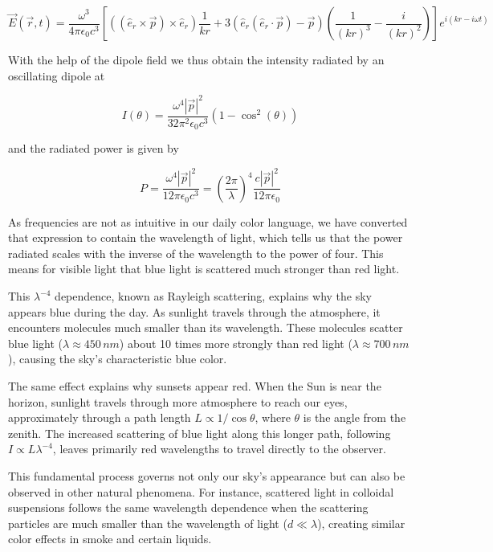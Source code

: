 \documentclass[
  a4paper,
]{book}
\begin{document}
\[
\vec{E}(\vec{r},t)=\frac{\omega^3}{4\pi \epsilon_0 c^3} \left [ ((\hat{e}_r\times \vec{p})\times \hat{e}_r)\frac{1}{k r}+3(\hat{e}_r(\hat{e}_r\cdot \vec{p})-\vec{p})\left(\frac{1}{(k r)^3}-\frac{i}{(kr)^2} \right)\right] e^{i(kr -i \omega t)}
\]

With the help of the dipole field we thus obtain the intensity radiated
by an oscillating dipole at

\[
I(\theta)=\frac{\omega^4|\vec{p}|^2}{32\pi^2 \epsilon_0 c^3}(1-\cos^2(\theta))
\]

and the radiated power is given by

\[
P=\frac{\omega^4 |\vec{p}|^2}{12\pi \epsilon_0 c^3}=\left (\frac{2\pi}{\lambda}\right )^4\frac{c|\vec{p}|^2}{12\pi \epsilon_0}
\tag{radiated power of an oscillating dipole}
\]

As frequencies are not as intuitive in our daily color language, we have
converted that expression to contain the wavelength of light, which
tells us that the power radiated scales with the inverse of the
wavelength to the power of four. This means for visible light that blue
light is scattered much stronger than red light.

This \(\lambda^{-4}\) dependence, known as Rayleigh scattering, explains
why the sky appears blue during the day. As sunlight travels through the
atmosphere, it encounters molecules much smaller than its wavelength.
These molecules scatter blue light (\(\lambda \approx 450\, nm\)) about
10 times more strongly than red light (\(\lambda \approx 700\, nm\)),
causing the sky's characteristic blue color.

The same effect explains why sunsets appear red. When the Sun is near
the horizon, sunlight travels through more atmosphere to reach our eyes,
approximately through a path length \(L \propto 1/\cos{\theta}\), where
\(\theta\) is the angle from the zenith. The increased scattering of
blue light along this longer path, following
\(I \propto L\lambda^{-4}\), leaves primarily red wavelengths to travel
directly to the observer.

This fundamental process governs not only our sky's appearance but can
also be observed in other natural phenomena. For instance, scattered
light in colloidal suspensions follows the same wavelength dependence
when the scattering particles are much smaller than the wavelength of
light (\(d \ll \lambda\)), creating similar color effects in smoke and
certain liquids.
\end{document}
